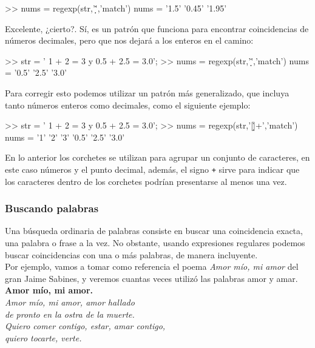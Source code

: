 \begin{matlab}
>> nums = regexp(str,'\d*\.\d*','match')
nums = 
    '1.5'    '0.45'    '1.95'
\end{matlab}

Excelente, ¿cierto?. Sí, es un patrón que funciona para encontrar
coincidencias de números decimales, pero que nos dejará a los enteros en
el camino:

\begin{matlab}
>> str = ' 1 + 2 = 3 y 0.5 + 2.5 = 3.0';
>> nums = regexp(str,'\d*\.\d*','match')
nums = 
    '0.5'    '2.5'    '3.0'
\end{matlab}

Para corregir esto podemos utilizar un patrón más generalizado, que
incluya tanto números enteros como decimales, como el siguiente ejemplo:

\begin{matlab}
>> str = ' 1 + 2 = 3 y 0.5 + 2.5 = 3.0';
>> nums = regexp(str,'[\d\.]+','match')
nums = 
    '1'    '2'    '3'    '0.5'    '2.5'    '3.0'
\end{matlab}

En lo anterior los corchetes se utilizan para agrupar un conjunto de
caracteres, en este caso números y el punto decimal, además, el signo
\texttt{+} sirve para indicar que los caracteres dentro de los corchetes
podrían presentarse al menos una vez.

\subsubsection{Buscando palabras}\label{buscando-palabras}

Una búsqueda ordinaria de palabras consiste en buscar una coincidencia
exacta, una palabra o frase a la vez. No obstante, usando expresiones
regulares podemos buscar coincidencias con una o más palabras, de manera
incluyente. \\

Por ejemplo, vamos a tomar como referencia el poema \emph{Amor mío, mi
amor} del gran Jaime Sabines, y veremos cuantas veces utilizó las
palabras amor y amar. \\

\textbf{Amor mío, mi amor.} \\

\emph{Amor mío, mi amor, amor hallado}\\
\emph{de pronto en la ostra de la muerte.}\\
\emph{Quiero comer contigo, estar, amar contigo,}\\
\emph{quiero tocarte, verte.} \\

